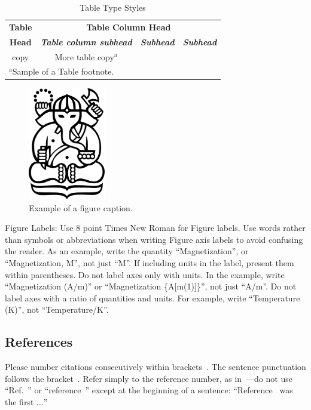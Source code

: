 \begin{table}[htbp]
	\caption{Table Type Styles}\label{tab1}
	\begin{center}
		\begin{tabular}{c c c c}
			\toprule
			\textbf{Table} & \multicolumn{3}{|c|}{\textbf{Table Column Head}}                                                         \\
			\cline{2-4}
			\textbf{Head}  & \textbf{\textit{Table column subhead}}           & \textbf{\textit{Subhead}} & \textbf{\textit{Subhead}} \\
			\midrule
			copy           & More table copy$^{\mathrm{a}}$                   &                           &                           \\
			\bottomrule
			\multicolumn{4}{l}{$^{\mathrm{a}}$Sample of a Table footnote.}
		\end{tabular}
	\end{center}
\end{table}

\begin{figure}[htbp]
	\centerline{\includegraphics[width=0.3\textwidth]{resources/cover-ganesha.jpg}}
	\caption{Example of a figure caption.}\label{fig}
\end{figure}

Figure Labels: Use 8 point Times New Roman for Figure labels. Use words
rather than symbols or abbreviations when writing Figure axis labels to
avoid confusing the reader. As an example, write the quantity
``Magnetization'', or ``Magnetization, M'', not just ``M''. If including
units in the label, present them within parentheses. Do not label axes only
with units. In the example, write ``Magnetization (A/m)'' or ``Magnetization
\{A[m\@(1)]\}'', not just ``A/m''. Do not label axes with a ratio of
quantities and units. For example, write ``Temperature (K)'', not
``Temperature/K''.


\subsection{References}
Please number citations consecutively within brackets\ \cite{b1}. The
sentence punctuation follows the bracket\ \cite{b2}. Refer simply to the reference
number, as in\ \cite{b3}---do not use ``Ref.\ \cite{b3}'' or ``reference\ \cite{b3}'' except at
the beginning of a sentence: ``Reference\ \cite{b3} was the first $\ldots$''


